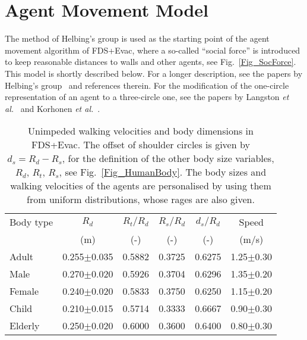 \documentclass[12pt,a4paper,final,twoside]{stylevk}
\begin{document}
\section{Agent Movement Model}\label{Sec_MoveModel}

\noindent The method of Helbing's group is used as the starting point
of the agent movement algorithm of FDS+Evac, where a so-called
``social force'' is introduced to keep reasonable distances to walls
and other agents, see Fig.~\ref{Fig_SocForce}.  This model is
shortly described below.  For a longer description, see the papers by
Helbing's group~\cite{Helbing95, Helbing00, Helbing02, Werner03} and
references therein.  For the modification of the one-circle
representation of an agent to a three-circle one, see the papers by
Langston {\em et al.}~\cite{Langston06} and Korhonen {\em et
  al.}~\cite{Korhonen07a, Korhonen07b, Korhonen08a, Korhonen08b}.

%
\begin{table}[b!]
\begin{center}
\caption{Unimpeded walking velocities and body dimensions in FDS+Evac.
   The offset of shoulder circles is given by $d_s = R_d - R_s$, for the
   definition of the other body size variables, $R_d$, $R_t$, $R_s$,
   see Fig.~\protect\ref{Fig_HumanBody}.  The body sizes and walking
   velocities of the agents are personalised by using them from uniform
   distributions, whose rages are also given.}\label{Table_DefaultHumans}  
\vspace{12pt}
\begin{tabular}{l c c c c c}\hline\hline 
Body type & $R_d$& $R_t/R_d$ & $R_s/R_d$  & $d_s/R_d$ & Speed \\
          & (m)  & (-)   &  (-)    & (-)    & (m/s) \\ \hline
Adult     & 0.255$\pm$0.035 & 0.5882 & 0.3725 & 0.6275 & 
          1.25$\pm$0.30 \\  %
Male      & 0.270$\pm$0.020 & 0.5926 & 0.3704 & 0.6296 &
          1.35$\pm$0.20 \\  %
Female    & 0.240$\pm$0.020 & 0.5833 & 0.3750 & 0.6250 & 
          1.15$\pm$0.20 \\  %
Child     & 0.210$\pm$0.015 & 0.5714 & 0.3333 & 0.6667 & 
          0.90$\pm$0.30 \\  %
Elderly   & 0.250$\pm$0.020 & 0.6000 & 0.3600 & 0.6400 & 
          0.80$\pm$0.30 \\ \hline\hline  %
\end{tabular}
\end{center}
\end{table}
%
\end{document}
